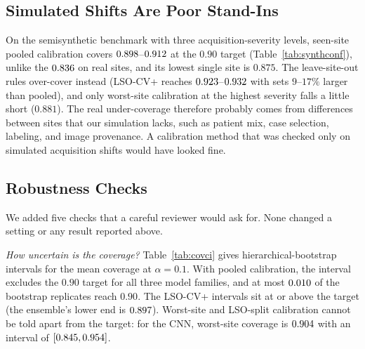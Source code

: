 \documentclass[journal]{IEEEtran}
\newcommand{\tabnote}[1]{\par\vspace{3pt}{\footnotesize\raggedright #1\par}}
\newcommand{\tabin}[1]{}
\begin{document}
\subsection{Simulated Shifts Are Poor Stand-Ins}\label{sec:simshift}
On the semisynthetic benchmark with three acquisition-severity levels, seen-site pooled calibration covers $0.898$--$0.912$ at the $0.90$ target (Table~\ref{tab:synthconf}), unlike the $0.836$ on real sites, and its lowest single site is $0.875$. The leave-site-out rules over-cover instead (LSO-CV+ reaches $0.923$--$0.932$ with sets $9$--$17\%$ larger than pooled), and only worst-site calibration at the highest severity falls a little short ($0.881$). The real under-coverage therefore probably comes from differences between sites that our simulation lacks, such as patient mix, case selection, labeling, and image provenance. A calibration method that was checked only on simulated acquisition shifts would have looked fine.
\begin{table}[!t]\centering\footnotesize\setlength{\tabcolsep}{1.5pt}
\caption{Conformal Coverage on the Semisynthetic Benchmark}\label{tab:synthconf}
\tabin{synth_conformal_short.tex}
\tabnote{Mean coverage over six units at $\alpha=0.1$ (target $0.90$), with the lowest single-site coverage in parentheses, for three acquisition severities at prior spread $0.25$. Size is the mean set size for pooled and LSO-CV+ calibration.}
\end{table}

\subsection{Robustness Checks}\label{sec:robust}
We added five checks that a careful reviewer would ask for. None changed a setting or any result reported above.

\emph{How uncertain is the coverage?} Table~\ref{tab:covci} gives hierarchical-bootstrap intervals for the mean coverage at $\alpha=0.1$. With pooled calibration, the interval excludes the $0.90$ target for all three model families, and at most $0.010$ of the bootstrap replicates reach $0.90$. The LSO-CV+ intervals sit at or above the target (the ensemble's lower end is $0.897$). Worst-site and LSO-split calibration cannot be told apart from the target: for the CNN, worst-site coverage is $0.904$ with an interval of $[0.845, 0.954]$.
\end{document}
